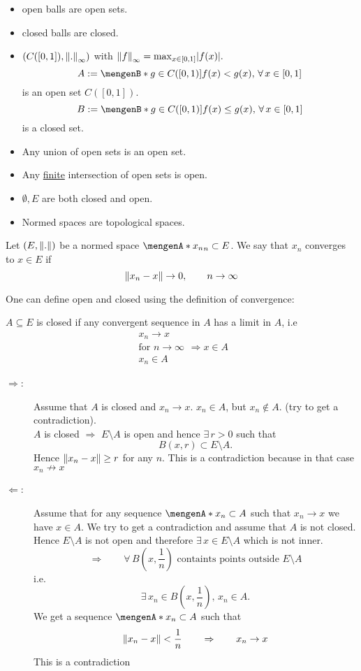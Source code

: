 \begin{bemerkung}
	\begin{itemize}
		\item open balls are open sets.
		\item closed balls are closed.
		\item $(C([0,1]),\norm{.}_{\infty})$ with $\norm{f}_{\infty}= \max_{x \in [0,1]}\abs{f(x)}.$ 
		\[
			A := \set[g \in C([0,1])]{f(x) < g(x),\,\forall\, x \in [0,1]}
		\]
		is an open set $C([0,1])$.
		\[
			B := \set[g \in C([0,1])]{f(x) \leq g(x),\,\forall\, x \in [0,1]}
 		\]
		is a closed set.
	\end{itemize}
	\begin{itemize}
		\item Any union of open sets is an open set.
		\item Any \underline{finite} intersection of open sets is open.
		\item $\emptyset,E$ are both closed and open.
		\item Normed spaces are topological spaces.
	\end{itemize}
\end{bemerkung}
\begin{definition*}
	Let $(E,\norm{.})$ be a normed space $\set{x_n}_n \subset E$. We say that $x_n$ converges to $x \in E$ if 
	\[
		\norm{x_n-x} \to 0, \qquad n \to \infty
	\]
\end{definition*}
One can define open and closed using the definition of convergence:
\begin{satz} %
	$A \subseteq E$ is closed if any convergent sequence in $A$ has a limit in $A$, i.e
	\[
		\substack{x_n \to x \\ \text{for }n \to \infty \\ x_n \in A} \Rightarrow x \in A
	\]
\end{satz}
\begin{beweis}
	\begin{description}
		\item[$\Rightarrow$:]Assume that $A$ is closed and $x_n \to x$. $x_n \in A$, but $x_n \not \in A$. (try to get a contradiction). \\
	 $A$ is closed $\Rightarrow $ $E \setminus A$ is open and hence $\exists\, r >0$ such that
	 \[
	 	B(x,r) \subset E \setminus A.
	 \]
	 Hence $\norm{x_n -x} \geq r$ for any $n$. This is a contradiction because in that case $x_n \not \to x$
	 \item[$\Leftarrow $:] Assume that for any sequence $\set{x_n} \subset A$ such that $x_n \to x$ we have $x \in A$. We try to get a contradiction and assume that $A$ is not closed. Hence $E \setminus A$ is not open and therefore $\exists\, x \in E \setminus A$ which is not inner.
	 \[
	 	\Rightarrow \qquad  \forall\, B(x,\frac{1}{n}) \text{ containts points outside }E \setminus A 
	 \]
	 i.e.
	 \[
	 	\exists\, x_n \in B(x, \frac{1}{n}), \, x_n \in A.
	 \]
	 We get a sequence $\set{x_n} \subset A$ such that
	 \[
	 	\norm{x_n-x} < \frac{1}{n} \qquad \Rightarrow \qquad x_n \to x
	 \]
	 This is a contradiction
	\end{description}
\end{beweis}
